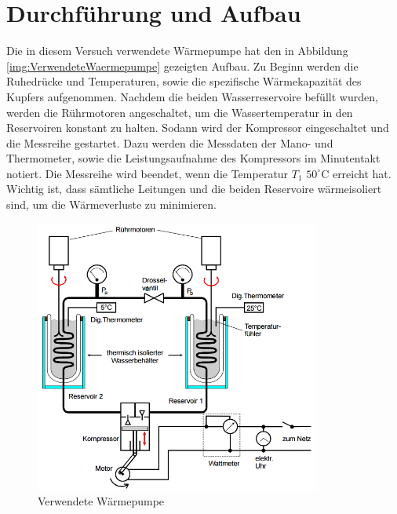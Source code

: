 \section{Durchführung und Aufbau}
\label{sec:Durchführung}

Die in diesem Versuch verwendete Wärmepumpe hat den in Abbildung \ref{img:VerwendeteWaermepumpe} gezeigten Aufbau. Zu Beginn werden die Ruhedrücke und Temperaturen, sowie die spezifische Wärmekapazität des Kupfers aufgenommen. Nachdem die beiden Wasserreservoire befüllt wurden, werden die Rührmotoren angeschaltet, um die Wassertemperatur in den Reservoiren konstant zu halten. Sodann wird der Kompressor eingeschaltet und die Messreihe gestartet. Dazu werden die Messdaten der Mano- und Thermometer, sowie die Leistungsaufnahme des Kompressors im Minutentakt notiert. Die Messreihe wird beendet, wenn die Temperatur $T_\text{1}$ $50^\circ \text{C}$ erreicht hat. \\
Wichtig ist, dass sämtliche Leitungen und die beiden Reservoire wärmeisoliert sind, um die Wärmeverluste zu minimieren.
\begin{figure}
	\centering
	\includegraphics[height=9cm]{Versuchsaufbau.png}
	\caption{Verwendete Wärmepumpe}
  \label{img:VerwendeteWaermepumpe[1]}
\end{figure}
\newpage
